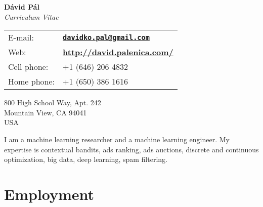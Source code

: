 \documentclass[9pt]{article}
\begin{document}
\begin{center}
{\huge \textbf{D\'avid P\'al}} \\[0.2cm]
\emph{Curriculum Vitae}
\end{center}

\vspace{0.2cm}

%
\noindent
%
\begin{minipage}{10cm}
\begin{tabular}{@{}ll}
E-mail:      & \href{mailto:davidko.pal@gmail.com}{\textbf{\texttt{davidko.pal@gmail.com}}} \\[0.1cm]
Web:         & \textbf{\url{http://david.palenica.com/}} \\[0.1cm]
Cell phone:  & +1 (646) 206 4832 \\[0.1cm]
Home phone:  & +1 (650) 386 1616 \\[0.1cm]
\end{tabular}
\end{minipage}
%
\begin{minipage}{10cm}
800 High School Way, Apt. 242 \\
Mountain View, CA 94041 \\
USA \\
\end{minipage}


\vspace{0.3cm}

\noindent I am a machine learning researcher and a machine learning engineer.
My expertise is contextual bandits, ads ranking, ads auctions, discrete and
continuous optimization, big data, deep learning, spam filtering.

\section*{Employment}
\end{document}
